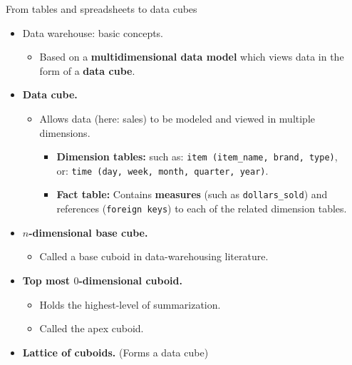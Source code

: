 \documentclass[aspectratio=169,t]{beamer}
\begin{document}
  { 
    \begin{frame}{From tables and spreadsheets to data cubes}
        \begin{itemize}
            \item Data warehouse: basic concepts.
            \begin{itemize}
              \item Based on a \textbf{\color{airforceblue}multidimensional data model} which views data in the form of a \textbf{data cube}.
            \end{itemize}
            \item \textbf{Data cube.}
            \begin{itemize}
              \item Allows data (here: sales) to be modeled and viewed in multiple dimensions.
              \begin{itemize}
                \item \textbf{Dimension tables:} such as: \texttt{item (item\_name, brand, type)},\\
                or: \texttt{time (day, week, month, quarter, year)}.
                \item \textbf{Fact table:} Contains \textbf{measures} (such as \texttt{dollars\_sold}) and references (\texttt{foreign keys}) to each of the related dimension tables.
              \end{itemize}
            \end{itemize}
            \item \textbf{$n$-dimensional base cube.}
            \begin{itemize}
              \item Called a base cuboid in data-warehousing literature.
            \end{itemize}
            \item \textbf{Top most $0$-dimensional cuboid.}
            \begin{itemize}
              \item Holds the highest-level of summarization.
              \item Called the apex cuboid.
            \end{itemize}
            \item \textbf{Lattice of cuboids.} (Forms a data cube)
        \end{itemize}
    \end{frame}
  }
\end{document}
